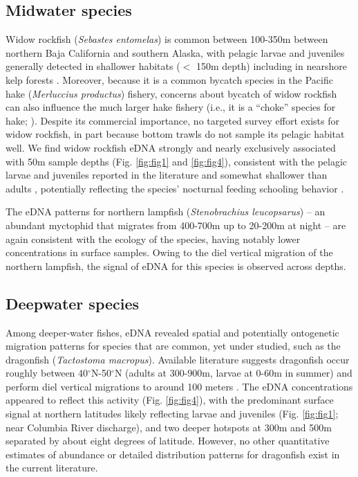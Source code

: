 \documentclass{article}
\begin{document}
\subsection*{Midwater species}
Widow rockfish (\textit{Sebastes entomelas}) is common between 100-350m between northern Baja California and southern Alaska, with pelagic larvae and juveniles generally detected in shallower habitats ($<$ 150m depth) \cite{reynolds2001,bosley2014} including in nearshore kelp forests \cite{quigley2024, laidig2007} . Moreover, because it is a common bycatch species in the Pacific hake (\textit{Merluccius productus}) fishery, concerns about bycatch of widow rockfish can also influence the much larger hake fishery (i.e., it is a “choke” species for hake; \cite{somers2018}). Despite its commercial importance, no targeted survey effort exists for widow rockfish, in part because bottom trawls do not sample its pelagic habitat well. We find widow rockfish eDNA strongly and nearly exclusively associated with 50m sample depths (Fig. \ref{fig:fig1} and \ref{fig:fig4}), consistent with the pelagic larvae and juveniles reported in the literature and somewhat shallower than adults \cite{reynolds2001,bosley2014,quigley2024}, potentially reflecting the species’ nocturnal feeding schooling behavior \cite{reynolds2001,bosley2014}.

The eDNA patterns for northern lampfish (\textit{Stenobrachius leucopsarus}) -- an abundant myctophid that migrates from 400-700m up to 20-200m at night \cite{moku2000,suntsov2008} -- are again consistent with the ecology of the species, having notably lower concentrations in surface samples. Owing to the diel vertical migration of the northern lampfish, the signal of eDNA for this species is observed across depths.

\subsection*{Deepwater species}
Among deeper-water fishes, eDNA revealed spatial and potentially ontogenetic migration patterns for species that are common, yet under studied, such as the dragonfish (\textit{Tactostoma macropus}). Available literature suggests dragonfish occur roughly between 40$^\circ$N-50$^\circ$N (adults at 300-900m, larvae at 0-60m in summer) \cite{kawaguchi1993} and perform diel vertical migrations to around 100 meters \cite{kawaguchi1993,willis1982}. The eDNA concentrations appeared to reflect this activity (Fig. \ref{fig:fig4}), with the predominant surface signal at northern latitudes likely reflecting larvae and juveniles (Fig. \ref{fig:fig1}; near Columbia River discharge), and two deeper hotspots at 300m and 500m separated by about eight degrees of latitude. However, no other quantitative estimates of abundance or detailed distribution patterns for dragonfish exist in the current literature.
\end{document}
